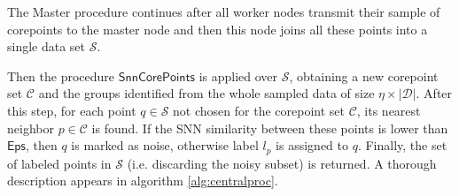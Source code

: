 \documentclass[preprint,12pt,authoryear,review]{elsarticle}
\newcommand*\pct{\scalebox{.9}{\%}}
\begin{document}
The Master procedure continues after all worker nodes transmit their sample of corepoints to the master node and then this node joins all these points into a single data set $\mathcal{S}$.

Then the procedure $\mathsf{SnnCorePoints}$ is applied over $\mathcal{S}$, obtaining a new corepoint set $\mathcal{C}$ and the groups identified from the whole sampled data of size $\eta \times |\mathcal{D}|$. After this step, for each point $q\in\mathcal{S}$ not chosen for the corepoint set $\mathcal{C}$, its nearest neighbor  $p\in\mathcal{C}$ is found. If the SNN similarity between these points is lower than $\mathsf{Eps}$, then $q$ is marked as noise, otherwise label $l_p$ is assigned to $q$.
Finally, the set of labeled points in $\mathcal{S}$ (i.e. discarding the noisy subset) is returned.
A thorough description appears in algorithm \ref{alg:centralproc}.
\end{document}
